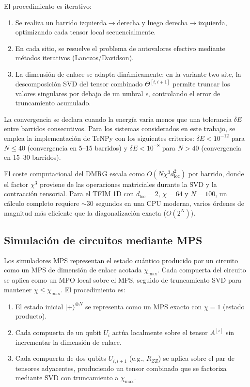 \documentclass[11pt,a4paper,spanish]{book}
\begin{document}
El procedimiento es iterativo:
\begin{enumerate}
    \item Se realiza un barrido izquierda$\to$derecha y luego derecha$\to$izquierda, optimizando cada tensor local secuencialmente.
    \item En cada sitio, se resuelve el problema de autovalores efectivo mediante métodos iterativos (Lanczos/Davidson).
    \item La dimensión de enlace se adapta dinámicamente: en la variante two-site, la descomposición SVD del tensor combinado $\Theta^{[i,i+1]}$ permite truncar los valores singulares por debajo de un umbral $\epsilon$, controlando el error de truncamiento acumulado.
\end{enumerate}

La convergencia se declara cuando la energía varía menos que una tolerancia $\delta E$ entre barridos consecutivos. Para los sistemas considerados en este trabajo, se emplea la implementación de TeNPy \citep{hauschild2018} con los siguientes criterios: $\delta E < 10^{-12}$ para $N \leq 40$ (convergencia en 5--15 barridos) y $\delta E < 10^{-8}$ para $N > 40$ (convergencia en 15--30 barridos).

El coste computacional del DMRG escala como $O(N \chi^3 d_{\text{loc}}^2)$ por barrido, donde el factor $\chi^3$ proviene de las operaciones matriciales durante la SVD y la contracción tensorial. Para el TFIM 1D con $d_{\text{loc}} = 2$, $\chi = 64$ y $N = 100$, un cálculo completo requiere $\sim$30 segundos en una CPU moderna, varios órdenes de magnitud más eficiente que la diagonalización exacta ($O(2^N)$).

\subsection{Simulación de circuitos mediante MPS}
\label{subsec:mps_sim}

Los simuladores MPS representan el estado cuántico producido por un circuito como un MPS de dimensión de enlace acotada $\chi_{\max}$. Cada compuerta del circuito se aplica como un MPO local sobre el MPS, seguido de truncamiento SVD para mantener $\chi \leq \chi_{\max}$. El procedimiento es:

\begin{enumerate}
    \item El estado inicial $|+\rangle^{\otimes N}$ se representa como un MPS exacto con $\chi = 1$ (estado producto).
    \item Cada compuerta de un qubit $U_i$ actúa localmente sobre el tensor $A^{[i]}$ sin incrementar la dimensión de enlace.
    \item Cada compuerta de dos qubits $U_{i,i+1}$ (e.g., $R_{ZZ}$) se aplica sobre el par de tensores adyacentes, produciendo un tensor combinado que se factoriza mediante SVD con truncamiento a $\chi_{\max}$.
\end{enumerate}
\end{document}
